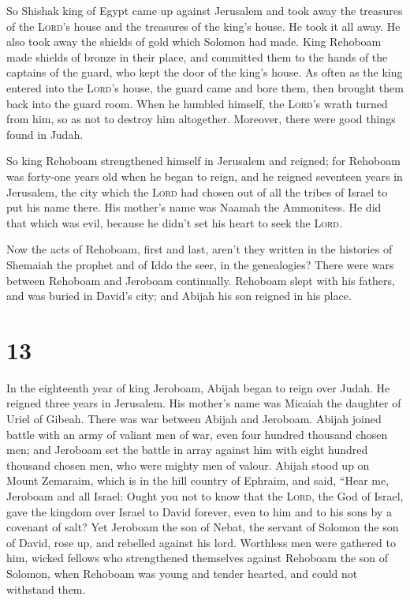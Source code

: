 So Shishak king of Egypt came up against Jerusalem and
took away the treasures of the \textsc{Lord}'s house and the treasures
of the king's house. He took it all away. He also took away the shields
of gold which Solomon had made.  King Rehoboam made
shields of bronze in their place, and committed them to the hands of the
captains of the guard, who kept the door of the king's house.
 As often as the king entered into the \textsc{Lord}'s
house, the guard came and bore them, then brought them back into the
guard room.  When he humbled himself, the \textsc{Lord}'s
wrath turned from him, so as not to destroy him altogether. Moreover,
there were good things found in Judah.

 So king Rehoboam strengthened himself in Jerusalem and
reigned; for Rehoboam was forty-one years old when he began to reign,
and he reigned seventeen years in Jerusalem, the city which the
\textsc{Lord} had chosen out of all the tribes of Israel to put his name
there. His mother's name was Naamah the Ammonitess.  He
did that which was evil, because he didn't set his heart to seek the
\textsc{Lord}.

 Now the acts of Rehoboam, first and last, aren't they
written in the histories of Shemaiah the prophet and of Iddo the seer,
in the genealogies? There were wars between Rehoboam and Jeroboam
continually.  Rehoboam slept with his fathers, and was
buried in David's city; and Abijah his son reigned in his place.

\hypertarget{section-12}{%
\section{13}\label{section-12}}

 In the eighteenth year of king Jeroboam, Abijah began to
reign over Judah.  He reigned three years in Jerusalem.
His mother's name was Micaiah the daughter of Uriel of Gibeah. There was
war between Abijah and Jeroboam.  Abijah joined battle
with an army of valiant men of war, even four hundred thousand chosen
men; and Jeroboam set the battle in array against him with eight hundred
thousand chosen men, who were mighty men of valour. 
Abijah stood up on Mount Zemaraim, which is in the hill country of
Ephraim, and said, ``Hear me, Jeroboam and all Israel: 
Ought you not to know that the \textsc{Lord}, the God of Israel, gave
the kingdom over Israel to David forever, even to him and to his sons by
a covenant of salt?  Yet Jeroboam the son of Nebat, the
servant of Solomon the son of David, rose up, and rebelled against his
lord.  Worthless men were gathered to him, wicked fellows
who strengthened themselves against Rehoboam the son of Solomon, when
Rehoboam was young and tender hearted, and could not withstand them.

